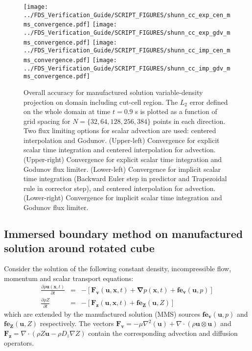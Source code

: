 \documentclass[12pt]{article}
\begin{document}
\begin{figure}[ht]
\centering
\texttt{[image: ../FDS\_Verification\_Guide/SCRIPT\_FIGURES/shunn\_cc\_exp\_cen\_mms\_convergence.pdf]}
\texttt{[image: ../FDS\_Verification\_Guide/SCRIPT\_FIGURES/shunn\_cc\_exp\_gdv\_mms\_convergence.pdf]}
\texttt{[image: ../FDS\_Verification\_Guide/SCRIPT\_FIGURES/shunn\_cc\_imp\_cen\_mms\_convergence.pdf]}
\texttt{[image: ../FDS\_Verification\_Guide/SCRIPT\_FIGURES/shunn\_cc\_imp\_gdv\_mms\_convergence.pdf]}
\caption[The {\ct Shunn CC} accuracy order test case]{Overall accuracy for manufactured solution variable-density projection on domain including cut-cell region. The $L_2$ error defined on the whole domain at time $t = 0.9$ s is plotted as a function of grid spacing for $N=\{32,64,128,256,384\}$ points in each direction. Two flux limiting options for scalar advection are used: centered interpolation and Godunov.  (Upper-left) Convergence for explicit scalar time integration and centered interpolation for advection.  (Upper-right) Convergence for explicit scalar time integration and Godunov flux limiter.  (Lower-left) Convergence for implicit scalar time integration (Backward Euler step in predictor and Trapezoidal rule in corrector step), and  centered interpolation for advection. (Lower-right) Convergence for implicit scalar time integration and Godunov flux limiter.  }\label{fig:shunn_cc_accuracy_order}
\end{figure}





\subsection{Immersed boundary method on manufactured solution around rotated cube}

Consider the solution of the following constant density, incompressible flow, momentum and scalar transport equations:
%
\begin{eqnarray}
  \frac{\partial \rho \mathbf{u}(\mathbf{x},t)}{\partial t} &=& -\left[ \mathbf{F_v}(\mathbf{u},\mathbf{x},t) + \boldsymbol{\nabla} p(\mathbf{x},t) + \mathbf{fe_v}(\mathbf{u},p) \right] \label{eq:mmsMom} \\
  \frac{\partial \rho Z}{\partial t} &=& -\left[   \mathbf{F_z}(\mathbf{u},\mathbf{x},t) +  \mathbf{fe_Z}(\mathbf{u},Z)   \right]
  \label{eq:mmsZ}
\end{eqnarray}
%
which are extended by the manufactured solution (MMS) sources $\mathbf{fe_v}(\mathbf{u},p)$ and $\mathbf{fe_Z}(\mathbf{u},Z)$ respectively. The vectors $\mathbf{F_v}=-\mu \nabla^2(\mathbf{u}) + \nabla \cdot \left( \rho \mathbf{u} \otimes \mathbf{u} \right)$ and $\mathbf{F_z}= \nabla \cdot \left( \rho Z \mathbf{u} - \rho D_z \nabla Z \right) $ contain the corresponding advection and diffusion operators.
\end{document}
